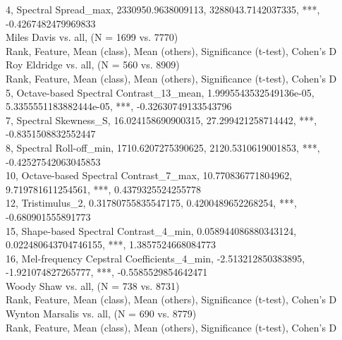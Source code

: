 4, Spectral Spread_max, 2330950.9638009113, 3288043.7142037335, ***, -0.4267482479969833\\
Miles Davis vs. all, (N = 1699 vs. 7770)\\
Rank, Feature, Mean (class), Mean (others), Significance (t-test), Cohen's D\\
Roy Eldridge vs. all, (N = 560 vs. 8909)\\
Rank, Feature, Mean (class), Mean (others), Significance (t-test), Cohen's D\\
5, Octave-based Spectral Contrast_13_mean, 1.9995543532549136e-05, 5.3355551183882444e-05, ***, -0.32630749133543796\\
7, Spectral Skewness_S, 16.024158690900315, 27.299421258714442, ***, -0.8351508832552447\\
8, Spectral Roll-off_min, 1710.6207275390625, 2120.5310619001853, ***, -0.42527542063045853\\
10, Octave-based Spectral Contrast_7_max, 10.770836771804962, 9.719781611254561, ***, 0.4379325524255778\\
12, Tristimulus_2, 0.31780755835547175, 0.4200489652268254, ***, -0.680901555891773\\
15, Shape-based Spectral Contrast_4_min, 0.058944086880343124, 0.022480643704746155, ***, 1.3857524668084773\\
16, Mel-frequency Cepstral Coefficients_4_min, -2.513212850383895, -1.921074827265777, ***, -0.5585529854642471\\
Woody Shaw vs. all, (N = 738 vs. 8731)\\
Rank, Feature, Mean (class), Mean (others), Significance (t-test), Cohen's D\\
Wynton Marsalis vs. all, (N = 690 vs. 8779)\\
Rank, Feature, Mean (class), Mean (others), Significance (t-test), Cohen's D\\
